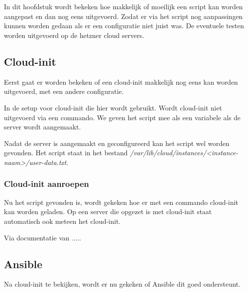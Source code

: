 \chapter{}
\label{ch:naopstarten}
In dit hoofdstuk wordt bekeken hoe makkelijk of moeilijk een script kan worden aangepast en dan nog eens uitgevoerd. Zodat er via het script nog aanpassingen kunnen worden gedaan als er een configuratie niet juist was. De eventuele testen worden uitgevoerd op de hetzner cloud servers.

\section{Cloud-init}
Eerst gaat er worden bekeken of een cloud-init makkelijk nog eens kan worden uitgevoerd, met een andere configuratie. 

In de setup voor cloud-init die hier wordt gebruikt. Wordt cloud-init niet uitgevoerd via een commando. We geven het script mee als een variabele als de server wordt aangemaakt. 

Nadat de server is aangemaakt en geconfigureerd kan het script wel worden gevonden. Het script staat in het bestand \textit{/var/lib/cloud/instances/<instance-naam>/user-data.txt}.

\subsection{Cloud-init aanroepen}
Nu het script gevonden is, wordt gekeken hoe er met een commando cloud-init kan worden geladen. Op een server die opgezet is met cloud-init staat automatisch ook meteen het cloud-init.

Via documentatie van \autocite{scaleaway}.....



\section{Ansible}
Na cloud-init te bekijken, wordt er nu gekeken of Ansible dit goed ondersteunt. 